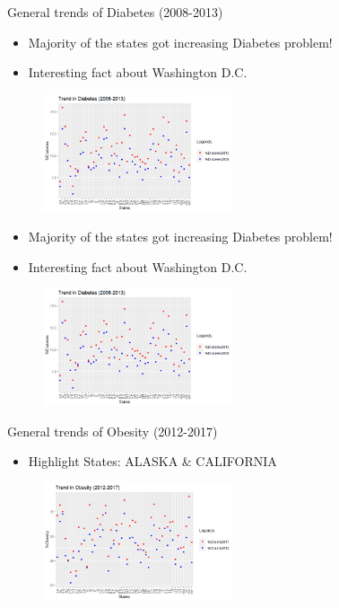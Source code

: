 \documentclass{beamer} %
\begin{document}
\begin{frame}{General trends of Diabetes (2008-2013)}

  \begin{itemize}
    \item Majority of the states got increasing Diabetes problem!
    \item Interesting fact about Washington D.C.
  \end{itemize}
  \begin{figure}
    \includegraphics[width=0.5\textwidth]{DiaTrend.png}
    \hfill
  \end{figure}

 \begin{itemize}
  \item Majority of the states got increasing Diabetes problem!
  \item Interesting fact about Washington D.C.
 \end{itemize}
   \begin{figure}
    \includegraphics[width=0.5\textwidth]{DiaTrend.png}
    \hfill
   \end{figure}
\end{frame}
\begin{frame}{General trends of Obesity (2012-2017)}
  \begin{itemize}
    \item Highlight States: ALASKA & CALIFORNIA
 \end{itemize}
 \begin{figure}
   \includegraphics[width=0.5\textwidth]{ObesityTrend.png}
   \hfill
 \end{figure}
\end{frame}
\end{document}
